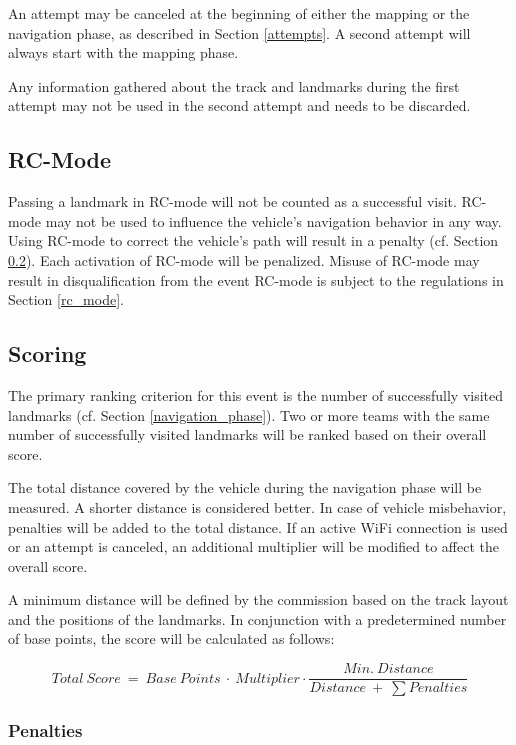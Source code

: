 An attempt may be canceled at the beginning of either the mapping or the navigation phase, as described in Section {\ref{attempts}}.
A second attempt will always start with the mapping phase.

Any information gathered about the track and landmarks during the first attempt may not be used in the second attempt and needs to be discarded.

\subsection{RC-Mode}

Passing a landmark in RC-mode will not be counted as a successful visit.
RC-mode may not be used to influence the vehicle's navigation behavior in any way.
Using RC-mode to correct the vehicle's path will result in a penalty (cf. Section \ref{navigation_scoring}).
Each activation of RC-mode will be penalized.
Misuse of RC-mode may result in disqualification from the event
RC-mode is subject to the regulations in Section \ref{rc_mode}.

\subsection{Scoring}
\label{navigation_scoring}

The primary ranking criterion for this event is the number of successfully visited landmarks (cf. Section {\ref{navigation_phase}}).
Two or more teams with the same number of successfully visited landmarks will be ranked based on their overall score.

The total distance covered by the vehicle during the navigation phase will be measured.
A shorter distance is considered better.
In case of vehicle misbehavior, penalties will be added to the total distance.
If an active WiFi connection is used or an attempt is canceled, an additional multiplier will be modified to affect the overall score.

A minimum distance will be defined by the commission based on the track layout and the positions of the landmarks.
In conjunction with a predetermined number of base points, the score will be calculated as follows:

\begin{equation*}
    Total\ Score\ =\ Base\ Points\ \cdot\ Multiplier \cdot\frac{Min.\ Distance}{Distance\ +\ \sum Penalties}
\end{equation*}

\subsubsection{Penalties}
\label{navigation_penalties}

